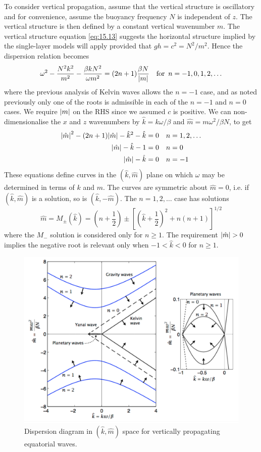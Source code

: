 \documentclass{jknotes}
\begin{document}
To consider vertical propagation, assume that the vertical structure is
oscillatory and for convenience, assume the buoyancy frequency $N$ is
independent of $z$. The vertical structure is then defined by a constant
vertical wavenumber $m$. The vertical structure equation \eqref{eq:15.13}
suggests the horizontal structure implied by the single-layer models will
apply provided that $gh = c^2 = N^2/m^2$. Hence the dispersion relation
becomes
\begin{equation}
	\omega^2 - \frac{N^2 k^2}{m^2} - \frac{\beta k N^2}{\omega m^2} = (2n+1)
	\frac{\beta N}{\abs{m}} \hspace{1em} \text{for} \,\,\, n = -1, 0, 1, 2,
	\dots
	\label{eq:vertdisp}
\end{equation}
where the previous analysis of Kelvin waves allows the $n=-1$ case, and as
noted previously only one of the roots is admissible in each of the $n = -1$
and $n=0$ cases. We require $\abs{m}$ on the RHS since we assumed $c$ is
positive. We can non-dimensionalise the $x$ and $z$ wavenumbers by $\hat{k} =
k\omega/\beta$ and $\hat{m} = m\omega^2/\beta N$, to get
\begin{align}
	\abs{\hat{m}}^2 - (2n+1)\abs{\hat{m}} - \hat{k}^2 - \hat{k} &= 0  &&n = 1,
	2, \dots \\
	\abs{\hat{m}} - \hat{k} - 1 &= 0 && n = 0 \\
	\abs{\hat{m}} - \hat{k} &= 0 && n = -1 
\end{align}
These equations define curves in the $(\hat{k},\hat{m})$ plane on which
$\omega$ may be determined in terms of $k$ and $m$. The curves are symmetric
about $\hat{m} = 0$, i.e. if $(\hat{k},\hat{m})$ is a solution, so is
$(\hat{k},-\hat{m})$. The $n = 1, 2, \dots$ case has solutions
\begin{equation}
	\hat{m} = M_{\pm}(\hat{k}) = (n+\frac{1}{2}) \pm \left[
	(\hat{k}+\frac{1}{2})^2 + n(n+1)\right]^{1/2}
\end{equation}
where the $M_-$ solution is considered only for $n \ge 1$. The requirement
$\abs{\hat{m}} > 0 $ implies the negative root is relevant only when $-1 <
\hat{k} < 0$ for $n \ge 1$. 

\begin{figure}
	\centering
	\includegraphics[width=.7\textwidth]{eqvert.png}
	\caption{Dispersion diagram in $(\hat{k},\hat{m})$ space for vertically
		propagating equatorial waves.}
\end{figure}
\end{document}
